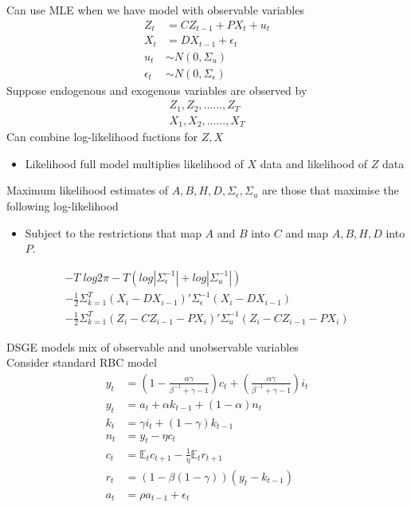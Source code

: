 \documentclass{beamer}
\begin{document}
\begin{frame}
  Can use MLE when we have model with observable variables  
\begin{align}  
  Z_t&=CZ_{t-1} + PX_t + u_t\\
  X_t &= DX_{t-1} + \epsilon_t\\
  u_t&\sim N(0,\Sigma_u)\\
  \epsilon_t&\sim N(0,\Sigma_\epsilon)
\end{align}
\medskip
 Suppose endogenous and exogenous variables are observed by
 \begin{align}
   Z_1,Z_2,......,Z_T\\
   X_1,X_2,......,X_T
 \end{align}
 Can combine log-likelihood fuctions for $Z,X$
 \begin{itemize}
  \item Likelihood full model multiplies likelihood of $X$ data and likelihood of $Z$ data  
 \end{itemize} 
\end{frame}

\begin{frame}
 Maximum likelihood estimates of $A,B,H,D,\Sigma_{\epsilon}, \Sigma_u$ are those that maximise the following log-likelihood
\begin{itemize}
  \item Subject to the restrictions that map $A$ and $B$ into $C$ and map $A,B,H,D$ into $P$.  
\end{itemize}
\begin{align}
  -T\;log2\pi - T (log |\Sigma_\epsilon^{-1}| + log |\Sigma_u^{-1}|)\\ \nonumber
  - \frac{1}{2}\Sigma_{k=1}^T(X_i-DX_{i-1})'\Sigma_\epsilon^{-1}(X_i-DX_{i-1})\\ \nonumber
  -\frac{1}{2}\Sigma_{k=1}^T(Z_i-CZ_{i-1}-PX_i)'\Sigma_u^{-1}(Z_i-CZ_{i-1}-PX_i)  \nonumber
\end{align}
\end{frame}

\begin{frame}
  DSGE models mix of observable and unobservable variables\\
  \medskip
  Consider standard RBC model
\begin{align*}
  y_t &= \left(1-\frac{\alpha \gamma}{\beta^{-1}+\gamma -1}\right)c_t +
  \left(\frac{\alpha \gamma}{\beta^{-1}+\gamma-1}\right)i_t\\
  y_t &= a_t +\alpha k_{t-1} + (1-\alpha)n_t\\
  k_t &= \gamma i_t + (1-\gamma)k_{t-1}\\
  n_t &= y_t-\eta c_t\\
  c_t &= \mathbb{E}_t c_{t+1} - \frac{1}{\eta}\mathbb{E}_t r_{t+1}\\
  r_t &= (1-\beta(1-\gamma))(y_t-k_{t-1})\\
  a_t &= \rho a_{t-1} + \epsilon_t
\end{align*}
\end{frame}
\end{document}

